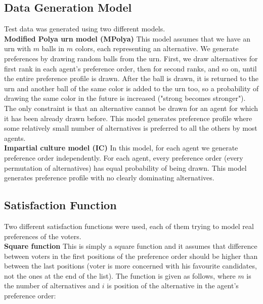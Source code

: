 \subsection{Data Generation Model}

Test data was generated using two different models.
\\

\noindent
\textbf{Modified Polya urn model (MPolya)} \hspace{.1in} This model assumes that we have an urn with $m$ balls in $m$ colors, each representing an alternative. We generate preferences by drawing random balls from the urn. First, we draw alternatives for first rank in each agent's preference order, then for second ranks, and so on, until the entire preference profile is drawn. After the ball is drawn, it is returned to the urn and another ball of the same color is added to the urn too, so a probability of drawing the same color in the future is increased ("strong becomes stronger"). The only constraint is that an alternative cannot be drawn for an agent for which it has been already drawn before. This model generates preference profile where some relatively small number of alternatives is preferred to all the others by most agents.
\\

\noindent
\textbf{Impartial culture model (IC)} \hspace{.1in} In this model, for each agent we generate preference order independently. For each agent, every preference order (every permutation of alternatives) has equal probability of being drawn. This model generates preference profile with no clearly dominating alternatives.

\subsection{Satisfaction Function}

Two different satisfaction functions were used, each of them trying to model real preferences of the voters.
\\

\noindent
\textbf{Square function} \hspace{.1in} This is simply a square function and it assumes that difference between voters in the first positions of the preference order should be higher than between the last positions (voter is more concerned with his favourite candidates, not the ones at the end of the list). The function is given as follows, where $m$ is the number of alternatives and $i$ is position of the alternative in the agent's preference order:

